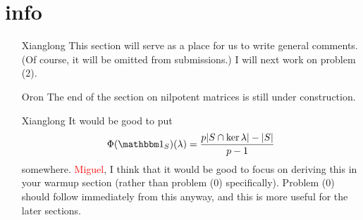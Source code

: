 \section*{info}
\begin{itemize}
	\item[Xianglong] This section will serve as a place for us to write general comments. (Of course, it will be omitted from submissions.) I will next work on problem (2).

    \item[Oron] The end of the section on nilpotent matrices is still under construction.
    
    \item[Xianglong] It would be good to put
    \[
    	\Phi(\IND_S)(\lambda) = \frac{p|S \cap \ker \lambda| - |S|}{p-1}
    \]
    somewhere. \textcolor{red}{Miguel}, I think that it would be good to focus on deriving this in your warmup section (rather than problem (0) specifically). Problem (0) should follow immediately from this anyway, and this is more useful for the later sections.
\end{itemize}
